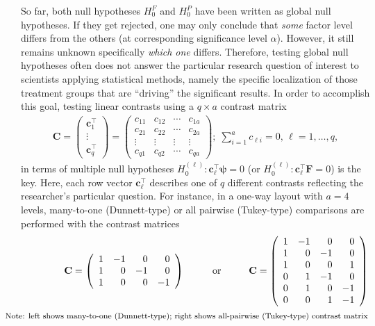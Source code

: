 So far, both null hypotheses $H_0^F$ and $H_0^P$ have been written as 
global null hypotheses. If they get rejected, one may only conclude that 
\textit{some} factor level differs from the others (at corresponding 
significance level $\alpha$). However, it still remains unknown specifically 
\textit{which one} differs. Therefore, testing global null hypotheses often 
does not answer the particular research question of interest to scientists 
applying statistical methods, namely the specific localization of those 
treatment groups that are ``driving'' the significant results. In order to 
accomplish this goal, testing linear contrasts using a $q \times a$ contrast 
matrix 
\begin{eqnarray*}
	\mathbf{C} = \left(\begin{array}{c} \mathbf{c}_1^\top\\ \vdots \\ 
	\mathbf{c}_q^\top
\end{array}\right) =\left(\begin{array}{cccc}
			c_{11} & c_{12} & \cdots & c_{1a}\\
			c_{21} & c_{22} &  \cdots & c_{2a}\\
			\vdots & \vdots & \vdots & \vdots \\
			c_{q1} &  c_{q2} &   \cdots & c_{qa}
			\end{array} \right); \; \sum_{i=1}^a c_{\ell i}=0,\, \ell=1,\ldots,q,
		\end{eqnarray*} 
in terms of multiple null hypotheses $H_0^{(\ell)}: \mathbf{c}_\ell^\top
\bm{\psi} = 0$ %
(or $H_0^{(\ell)}: \mathbf{c}_\ell^\top\bm{F}=0$) is the key. Here, each row 
vector $\mathbf{c}_\ell^\top$ describes one of $q$ different contrasts 
reflecting the researcher's particular question. For instance, in a one-way 
layout with $a=4$ levels, many-to-one (Dunnett-type) 
\citep{dunnett1955multiple} or all pairwise (Tukey-type) comparisons are 
performed with the contrast matrices 
\begin{eqnarray*}
&&	\mathbf{C} = \left(\begin{array}{rrrr}
			1 & -1 & 0 &  0\\
			1 & 0 & -1 & 0\\
			1 &  0 & 0  &-1
			\end{array} \right) \hspace{1cm}\text{or}\hspace{1cm}
		\mathbf{C} = \left(\begin{array}{rrrr}
			1 & -1 & 0 & 0\\
			1 & 0 & -1 & 0\\
			1 &  0 & 0& 1\\ 
				0 & 1 & -1 & 0\\
			0 & 1 & 0 & -1\\
			0 &  0 & 1& -1\\ 
			\end{array} \right)\\
		&&\hspace{-1cm}\text{{\footnotesize Note: left shows many-to-one (Dunnett-type); right shows all-pairwise (Tukey-type) contrast matrix}}	
		\end{eqnarray*} 
		
